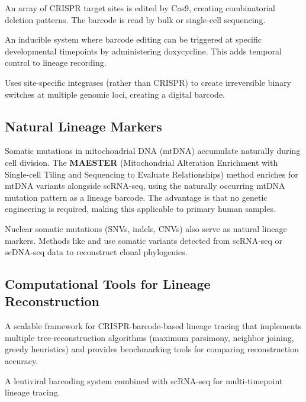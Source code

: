 \begin{description}[style=nextline, itemsep=3pt]
  \item[GESTALT] An array of CRISPR target sites is edited by Cas9, creating combinatorial deletion patterns. The barcode is read by bulk or single-cell sequencing.
  \item[CARLIN] An inducible system where barcode editing can be triggered at specific developmental timepoints by administering doxycycline. This adds temporal control to lineage recording.
  \item[intMEMOIR] Uses site-specific integrases (rather than CRISPR) to create irreversible binary switches at multiple genomic loci, creating a digital barcode.
\end{description}

\subsection{Natural Lineage Markers}
\label{subsec:multiomics:natural-lineage}

\begin{description}[style=nextline, itemsep=3pt]
  \item[Mitochondrial mutations (MAESTER)] Somatic mutations in mitochondrial DNA (mtDNA) accumulate naturally during cell division. The \textbf{MAESTER} (Mitochondrial Alteration Enrichment with Single-cell Tiling and Sequencing to Evaluate Relationships) method enriches for mtDNA variants alongside scRNA-seq, using the naturally occurring mtDNA mutation pattern as a lineage barcode. The advantage is that no genetic engineering is required, making this applicable to primary human samples.

  \item[Somatic nuclear mutations] Nuclear somatic mutations (SNVs, indels, CNVs) also serve as natural lineage markers. Methods like  and  use somatic variants detected from scRNA-seq or scDNA-seq data to reconstruct clonal phylogenies.
\end{description}

\subsection{Computational Tools for Lineage Reconstruction}
\label{subsec:multiomics:lineage-tools}

\begin{description}[style=nextline, itemsep=2pt]
  \item[\software{Cassiopeia}] A scalable framework for CRISPR-barcode-based lineage tracing that implements multiple tree-reconstruction algorithms (maximum parsimony, neighbor joining, greedy heuristics) and provides benchmarking tools for comparing reconstruction accuracy.
  \item[\software{CellTagging}] A lentiviral barcoding system combined with scRNA-seq for multi-timepoint lineage tracing.
\end{description}


